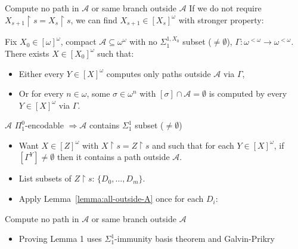 \begin{frame}{Compute no path in $\mathcal{A}$ or same branch
outside $\mathcal{A}$}
  If we do not require $X_{s+1}\restriction s=X_s\restriction s$, we can
  find $X_{s+1}\in[X_s]^\omega$ with stronger property:

  \begin{lemma}
  \label{lemma:all-outside-A}
    Fix $X_0\in[\omega]^\omega$, compact
    $\mathcal{A}\subseteq\omega^\omega$ with no $\Sigma_1^{1,X_0}$ subset
    ($\neq\emptyset$), $\Gamma:\omega^{<\omega} \rightarrow
    \omega^{<\omega}$. There exists $X\in[X_0]^\omega$ such that:

    \begin{itemize}
      \item Either every $Y\in[X]^\omega$ computes only paths outside
        $\mathcal{A}$ via $\Gamma$,
      \item Or for every $n\in\omega$, some $\sigma\in\omega^n$ with
        $[\sigma]\cap\mathcal{A}=\emptyset$ is computed by every
        $Y\in[X]^\omega$ via $\Gamma$.
    \end{itemize}
  \end{lemma}
\end{frame}

\begin{frame}{$\mathcal{A}$ $\Pi_1^0$-encodable $\Rightarrow \mathcal{A}$
contains $\Sigma_1^1$ subset ($\neq\emptyset$)}
  \begin{itemize}
    \item Want $X\in[Z]^\omega$ with $X\restriction s=Z\restriction s$
      and such that for each $Y\in[X]^\omega$, if $[\Gamma^Y]\neq\emptyset$
      then it contains a path outside $\mathcal{A}$.
    \item List subsets of $Z\restriction s$: $\{D_0,\ldots,D_m\}$.
    \item Apply Lemma~\ref{lemma:all-outside-A} once for each $D_i$:
  \end{itemize}
\end{frame}

\begin{frame}{Compute no path in $\mathcal{A}$ or same branch
  outside $\mathcal{A}$}
  \begin{itemize}
    \item Proving Lemma 1 uses $\Sigma_1^1$-immunity basis theorem and
      Galvin-Prikry
  \end{itemize}
\end{frame}

